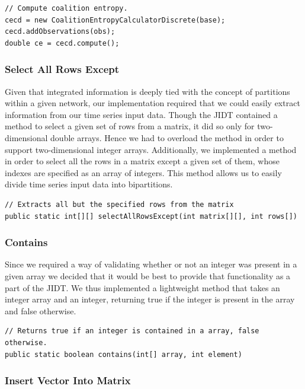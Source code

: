 \documentclass[a4paper,11pt]{article}
\begin{document}
\begin{verbatim}
// Compute coalition entropy.
cecd = new CoalitionEntropyCalculatorDiscrete(base);
cecd.addObservations(obs);
double ce = cecd.compute();
\end{verbatim}

\subsubsection{Select All Rows Except}

Given that integrated information is deeply tied with the concept of partitions within a given network, our implementation required that we could easily extract information from our time series input data. Though the JIDT contained a method to select a given set of rows from a matrix, it did so only for two-dimensional double arrays. Hence we had to overload the method in order to support two-dimensional integer arrays. Additionally, we implemented a method in order to select all the rows in a matrix except a given set of them, whose indexes are specified as an array of integers. This method allows us to easily divide time series input data into bipartitions. 

\begin{verbatim}
// Extracts all but the specified rows from the matrix
public static int[][] selectAllRowsExcept(int matrix[][], int rows[])
\end{verbatim}

\subsubsection{Contains}

Since we required a way of validating whether or not an integer was present in a given array we decided that it would be best to provide that functionality as a part of the JIDT. We thus implemented a lightweight method that takes an integer array and an integer, returning true if the integer is present in the array and false otherwise.

\begin{verbatim}
// Returns true if an integer is contained in a array, false otherwise.
public static boolean contains(int[] array, int element)
\end{verbatim}

\subsubsection{Insert Vector Into Matrix}
\end{document}
